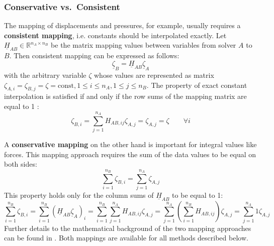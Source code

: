   \subsubsection{Conservative vs.\ Consistent}\label{sec:Coupl-DataMapping-conVScon}
   The mapping of displacements and pressures, for example, usually requires a \textbf{consistent mapping}, i.e. constants should be interpolated exactly. Let $\underline{H}_{AB} \in \mathbb{R}^{n_A \times n_B}$ be the matrix mapping values between variables from solver $A$ to $B$. Then consistent mapping can be expressed as follows:
   \begin{equation}
   \underline{\zeta}_B = \underline{H}_{AB} \underline{\zeta}_A
   \end{equation}
   with the arbitrary variable $\zeta$ whose values are represented as matrix $\zeta_{A,i} = \zeta_{B,j} = \zeta = \text{const}, 1 \leq i \leq n_A, 1 \leq j \leq n_B$. The property of exact constant interpolation is satisfied if and only if the row sums of the mapping matrix are equal to 1 \cite{gatzhammer2015efficient}:
   \begin{equation}
   \zeta_{B,i} = \sum_{j=1}^{n_A} H_{AB,ij}\zeta_{A,j} = \zeta_{A,j} = \zeta \qquad \forall i
   \end{equation}
   
   A \textbf{conservative mapping} on the other hand is important for integral values like forces. This mapping approach requires the sum of the data values to be equal on both sides:
   \begin{equation}
   \sum_{i=1}^{n_B}\zeta_{B,i} = \sum_{j=1}^{n_A}\zeta_{A,j}
   \end{equation}
   This property holds only for the column sums of $\underline{H}_{AB}$ to be equal to 1:
   \begin{equation}
   \sum_{i=1}^{n_B}\zeta_{B,i} = \sum_{i=1}^{n_B}\left( \underline{H}_{AB}\underline{\zeta}_A \right)_i = \sum_{i=1}^{n_B}\sum_{j=1}^{n_A} H_{AB,ij}\zeta_{A,j} = \sum_{j=1}^{n_A}\left( \sum_{i=1}^{n_B} H_{AB,ij}\right) \zeta_{A,j} = \sum_{j=1}^{n_A} 1 \zeta_{A,j}
   \end{equation}
   Further details to the mathematical background of the two mapping approaches can be found in \cite{gatzhammer2015efficient}. Both mappings are available for all methods described below.

